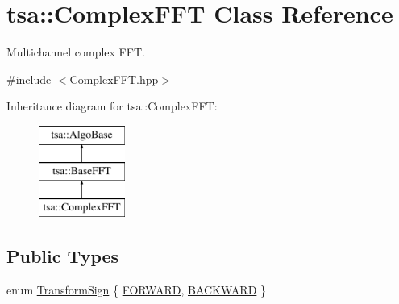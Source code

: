 \hypertarget{classtsa_1_1_complex_f_f_t}{}\section{tsa\+:\+:Complex\+F\+FT Class Reference}
\label{classtsa_1_1_complex_f_f_t}


Multichannel complex F\+FT.  




{\ttfamily \#include $<$Complex\+F\+F\+T.\+hpp$>$}

Inheritance diagram for tsa\+:\+:Complex\+F\+FT\+:\begin{figure}[H]
\begin{center}
\leavevmode
\includegraphics[height=3.000000cm]{classtsa_1_1_complex_f_f_t}
\end{center}
\end{figure}
\subsection*{Public Types}
\begin{DoxyCompactItemize}
\item 
enum \hyperlink{classtsa_1_1_complex_f_f_t_a4e90a372fa0610f957f2c683335aa766}{Transform\+Sign} \{ \hyperlink{classtsa_1_1_complex_f_f_t_a4e90a372fa0610f957f2c683335aa766a907b249808a0c1affb86572baa34510f}{F\+O\+R\+W\+A\+RD}, 
\hyperlink{classtsa_1_1_complex_f_f_t_a4e90a372fa0610f957f2c683335aa766ab056de3bb0b051b60f40de6cb7a560de}{B\+A\+C\+K\+W\+A\+RD}
 \}
\end{DoxyCompactItemize}
